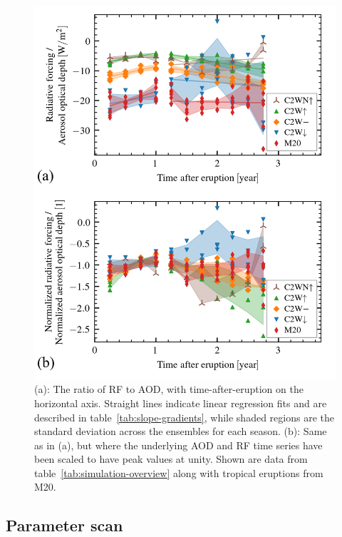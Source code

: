 \documentclass[draft]{agujournal2019}
\begin{document}
\begin{figure}
  \centering
  \includegraphics{figures/figure3.png}

  \caption{(a): The ratio of RF to AOD, with time-after-eruption on the horizontal axis.
    Straight lines indicate linear regression fits and are described in
    table~\ref{tab:slope-gradients}, while shaded regions are the standard deviation across
    the ensembles for each season. (b): Same as in (a), but where the underlying AOD and RF
    time series have been scaled to have peak values at unity. Shown are data from
    table~\ref{tab:simulation-overview} along with tropical eruptions from
    M20.}\label{fig:aod_vs_toa_avg_loop_ratios}%
\end{figure}

\subsection{Parameter scan}
\end{document}
